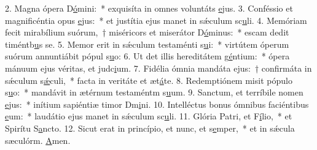 2. Magna ópera D\uline{ó}mini:~* exquisíta in omnes voluntáts \uline{e}jus.
3. Conféssio et magnificéntia opus \uline{e}jus:~* et justítia ejus manet in sǽculum sc\uline{u}li.
4. Memóriam fecit mirabílium suórum,~† miséricors et miserátor D\uline{ó}minus:~* escam dedit timéntb\uline{u}s se.
5. Memor erit in sǽculum testaménti s\uline{u}i:~* virtútem óperum suórum annuntiábit pópul s\uline{u}o:
6. Ut det illis hereditátem g\uline{é}ntium:~* ópera mánuum ejus véritas, et judc\uline{i}um.
7. Fidélia ómnia mandáta ejus:~† confirmáta in sǽculum s\uline{ǽ}culi,~* facta in veritáte et æt\uline{á}te.
8. Redemptiónem misit pópulo s\uline{u}o:~* mandávit in ætérnum testaméntm s\uline{u}um.
9. Sanctum, et terríbile nomen \uline{e}jus:~* inítium sapiéntiæ timor Dm\uline{i}ni.
10. Intelléctus bonus ómnibus faciéntibus \uline{e}um:~* laudátio ejus manet in sǽculum sc\uline{u}li.
11. Glória Patri, et F\uline{í}lio,~* et Spirítu S\uline{a}ncto.
12. Sicut erat in princípio, et nunc, et s\uline{e}mper,~* et in sǽcula sæculórm. \uline{A}men.
